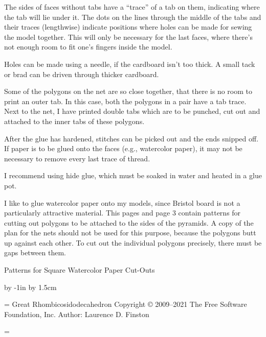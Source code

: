 The sides of faces without tabs have a ``trace'' of a tab on them,
indicating where the tab will lie under it.  The dots on the lines
through the middle of the tabs and their traces (lengthwise) indicate
positions where holes can be made for sewing the model together.  This
will only be necessary for the last faces, where there's not enough
room to fit one's fingers inside the model.  

Holes can be made using a needle, if the cardboard isn't too thick.
A small tack or brad can be driven through thicker cardboard.

Some of the polygons on the net are so close together, that there is no room
to print an outer tab.  In this case, both the polygons in a pair have a 
tab trace.  Next to the net, I have printed double tabs which are to be
punched, cut out and attached to the inner tabs of these polygons.

After the glue has hardened, stitches can be picked out and the ends
snipped off.  If paper is to be glued onto the faces (e.g., watercolor
paper), it may not be necessary to remove every last trace of thread.

I recommend using hide glue, which must be soaked in water and heated
in a glue pot.

I like to glue watercolor paper onto my models, since Bristol board is
not a particularly attractive material.  This pages and page 3 contain 
patterns for cutting out polygons to be attached to the sides of the pyramids.
A copy of the plan for the nets should not be used for this purpose, because
the polygons butt up against each other.  To cut out the individual 
polygons precisely, there must be gaps between them.
\par
\endgroup

\baselineskip
\centerline{{\largebx Patterns for Square Watercolor Paper Cut-Outs}}
\baselineskip
{}

\vfil\eject


\advance\hoffset by -1in
\advance\hoffset by 1.5cm




\headline={\hskip 2cm Great Rhombicosidodecahedron\quad %
           Copyright {\copyright} 2009--2021 The Free Software Foundation, Inc.\hfil %
           \folio\hfil Author:  Laurence D. Finston\hfil}

=\hbox{\hskip 1.5cm}

